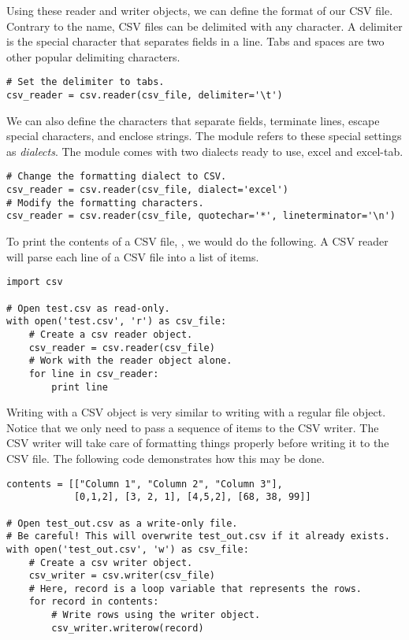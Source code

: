 Using these reader and writer objects, we can define the format of our CSV file.
Contrary to the name, CSV files can be delimited with any character.
A delimiter is the special character that separates fields in a line.
Tabs and spaces are two other popular delimiting characters.
\begin{lstlisting}
# Set the delimiter to tabs.
csv_reader = csv.reader(csv_file, delimiter='\t')
\end{lstlisting}

We can also define the characters that separate fields, terminate lines, escape special characters, and enclose strings.
The  module refers to these special settings as \emph{dialects}.
The module comes with two dialects ready to use, excel and excel-tab.
\begin{lstlisting}
# Change the formatting dialect to CSV.
csv_reader = csv.reader(csv_file, dialect='excel')
# Modify the formatting characters.
csv_reader = csv.reader(csv_file, quotechar='*', lineterminator='\n')

\end{lstlisting}

To print the contents of a CSV file, , we would do the following.  A CSV reader will parse each line of a CSV file into a list of items.
\begin{lstlisting}
import csv

# Open test.csv as read-only.
with open('test.csv', 'r') as csv_file:
    # Create a csv reader object.
    csv_reader = csv.reader(csv_file)
    # Work with the reader object alone.
    for line in csv_reader:
        print line
\end{lstlisting}

Writing with a CSV  object is very similar to writing with a regular file object.  Notice that we only need to pass a sequence of items to the CSV writer.  The CSV writer will take care of formatting things properly before writing it to the CSV file.
The following code demonstrates how this may be done.
\begin{lstlisting}
contents = [["Column 1", "Column 2", "Column 3"],
            [0,1,2], [3, 2, 1], [4,5,2], [68, 38, 99]]

# Open test_out.csv as a write-only file.
# Be careful! This will overwrite test_out.csv if it already exists.
with open('test_out.csv', 'w') as csv_file:
    # Create a csv writer object.
    csv_writer = csv.writer(csv_file)
    # Here, record is a loop variable that represents the rows.
    for record in contents:
        # Write rows using the writer object.
        csv_writer.writerow(record)
\end{lstlisting}

